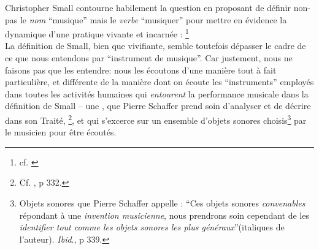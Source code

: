 \indent Christopher Small contourne habilement la question en proposant de définir non-pas le \textit{nom} ``musique'' mais le \textit{verbe} ``musiquer'' pour mettre en évidence la dynamique d'une pratique vivante et incarnée : \label{def:musicking}\footnote{cf. \cite{small_musicking:_1998}}\\
\indent La définition de Small, bien que vivifiante, semble toutefois dépasser le cadre de ce que nous entendons par ``instrument de musique''. Car justement, nous ne faisons pas que les entendre: nous les écoutons d'une manière tout à fait particulière, et différente de la manière dont on écoute les ``instruments'' employés dans toutes les activités humaines qui \textit{entourent} la performance musicale dans la définition de Small -- une , que Pierre Schaffer prend soin d'analyser et de décrire dans son Traité, \footnote{Cf. \cite{schaeffer_traite_1966}, p 332.}, et qui s'excerce sur un ensemble d'objets sonores choisis\footnote{Objets sonores que Pierre Schaffer appelle : ``Ces objets sonores \textit{convenables} répondant à une \textit{invention musicienne}, nous prendrons soin cependant de les \textit{identifier tout comme les objets sonores les plus généraux}''(italiques de l'auteur). \textit{Ibid}., p 339.} par le musicien pour être écoutés.

